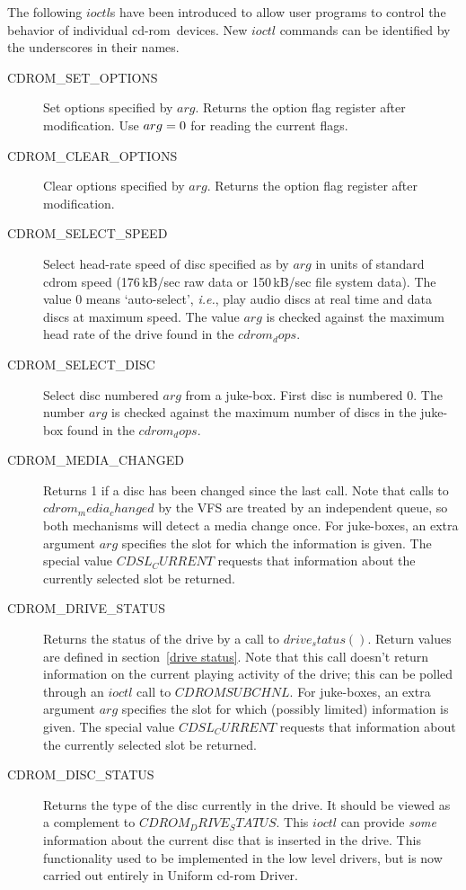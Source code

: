 \documentclass{article}
\def\cdrom{{\sc cd-rom}}
\def\UCD{{\sc Uniform cd-rom Driver}}
\def\fo{\sl}                    %
\def\ie{{\fo i.e.}}
\begin{document}
The following $ioctl$s have been introduced to allow user programs to
control the behavior of individual \cdrom\ devices. New $ioctl$
commands can be identified by the underscores in their names.
\begin{description}
\item[CDROM_SET_OPTIONS] Set options specified by $arg$. Returns the
option flag register after modification. Use  $arg = \rm0$ for reading
the current flags.
\item[CDROM_CLEAR_OPTIONS] Clear options specified by $arg$. Returns
  the option flag register after modification.
\item[CDROM_SELECT_SPEED] Select head-rate speed of disc specified as
  by $arg$ in units of standard cdrom speed (176\,kB/sec raw data or
  150\,kB/sec file system data). The value 0 means `auto-select', \ie,
  play audio discs at real time and data discs at maximum speed. The value
  $arg$ is checked against the maximum head rate of the drive found in the
  $cdrom_dops$.
\item[CDROM_SELECT_DISC] Select disc numbered $arg$ from a juke-box.
  First disc is numbered 0. The number $arg$ is checked against the
  maximum number of discs in the juke-box found in the $cdrom_dops$.
\item[CDROM_MEDIA_CHANGED] Returns 1 if a disc has been changed since
  the last call. Note that calls to $cdrom_media_changed$ by the VFS
  are treated by an independent queue, so both mechanisms will detect
  a media change once. For juke-boxes, an extra argument $arg$
  specifies the slot for which the information is given. The special
  value $CDSL_CURRENT$ requests that information about the currently
  selected slot be returned.
\item[CDROM_DRIVE_STATUS] Returns the status of the drive by a call to
  $drive_status()$. Return values are defined in section~\ref{drive
   status}. Note that this call doesn't return information on the
  current playing activity of the drive; this can be polled through an
  $ioctl$ call to $CDROMSUBCHNL$. For juke-boxes, an extra argument
  $arg$ specifies the slot for which (possibly limited) information is
  given. The special value $CDSL_CURRENT$ requests that information
  about the currently selected slot be returned.
\item[CDROM_DISC_STATUS] Returns the type of the disc currently in the
  drive.  It should be viewed as a complement to $CDROM_DRIVE_STATUS$.
  This $ioctl$ can provide \emph {some} information about the current
  disc that is inserted in the drive.  This functionality used to be
  implemented in the low level drivers, but is now carried out
  entirely in \UCD.
  

\end{description}
\end{document}
